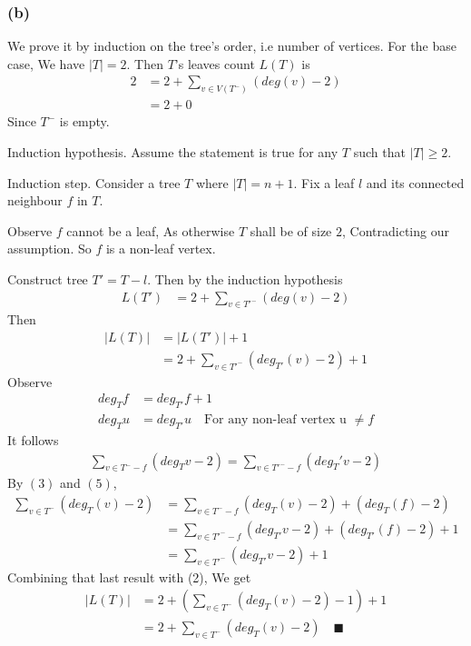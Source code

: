 \documentclass[12pt]{extarticle}
\begin{document}
\subsubsection*{(b)}

We prove it by induction on the tree's order, i.e number of vertices. For the base case, We have $|T| = 2$. Then $T$'s leaves count $L(T)$ is
\begin{align*}
    2 &= 2 + \sum_{v \in V(T^-)} ( deg(v) - 2 ) \\
    &= 2 + 0
\end{align*}
Since $T^-$ is empty.

Induction hypothesis. Assume the statement is true for any $T$ such that $|T| \geq 2$.

Induction step. Consider a tree $T$ where $|T| = n+1$. Fix a leaf $l$ and its connected neighbour $f$ in $T$.

Observe $f$ cannot be a leaf, As otherwise $T$ shall be of size $2$, Contradicting our assumption. So $f$ is a non-leaf vertex.

Construct tree $T' = T - l$. Then by the induction hypothesis
\begin{align*}
    L(T') &= 2 + \sum_{v \in T'^-} (deg(v) - 2)
\end{align*}
Then 
\begin{align}
    |L(T)| &= |L(T')| + 1 \\
    &= 2 + \sum_{v \in T'^-} (deg_{T'}(v) - 2) + 1
\end{align}
Observe
\begin{align}
    deg_T f &= deg_{T'} f + 1 \\
    deg_T u &= deg_{T'} u \quad \text{For any non-leaf vertex u } \neq f
\end{align}
It follows
\begin{align}
    \sum_{v \in T^- - f} (deg_T v - 2) = \sum_{v \in T'^- - f} (deg_T' v - 2)
\end{align}
By $(3)$ and $(5)$,
\begin{align*}
    \sum_{v \in T^-} (deg_T(v) - 2) &= \sum_{v \in T^- - f} (deg_T(v) - 2) + (deg_T(f) - 2) \\
    &= \sum_{v \in T'^- - f} (deg_{T'} v - 2) + (deg_{T'}(f) - 2) + 1 \\
    &= \sum_{v \in T'^-} (deg_{T'} v - 2) + 1
\end{align*}
Combining that last result with (2), We get
\begin{align*}
    |L(T)| &= 2 + \left ( \sum_{v \in T^-} (deg_T(v) - 2) - 1 \right ) + 1 \\
    &= 2 + \sum_{v \in T^-} (deg_T(v) - 2) \quad \blacksquare \\
\end{align*}
\end{document}

